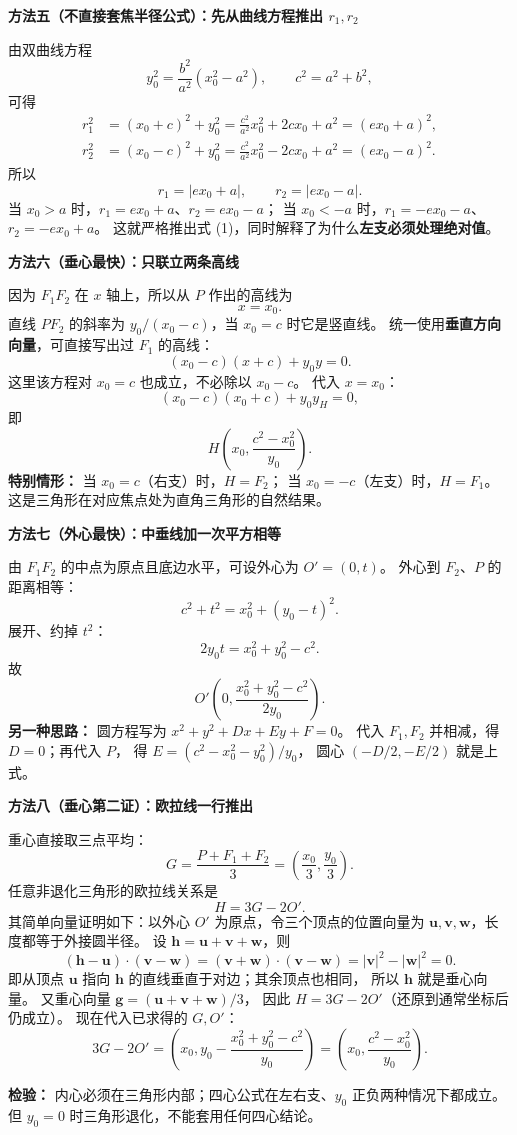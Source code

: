 \begin{proofbox}
\textbf{方法五（不直接套焦半径公式）：先从曲线方程推出 $r_1,r_2$}

由双曲线方程
\[
y_0^2=\frac{b^2}{a^2}(x_0^2-a^2),\qquad c^2=a^2+b^2,
\]
可得
\begin{align*}
r_1^2&=(x_0+c)^2+y_0^2
=\frac{c^2}{a^2}x_0^2+2cx_0+a^2
=(ex_0+a)^2,\\
r_2^2&=(x_0-c)^2+y_0^2
=\frac{c^2}{a^2}x_0^2-2cx_0+a^2
=(ex_0-a)^2.
\end{align*}
所以
\[
\boxed{r_1=|ex_0+a|},\qquad
\boxed{r_2=|ex_0-a|}.
\]
当 $x_0>a$ 时，$r_1=ex_0+a$、$r_2=ex_0-a$；
当 $x_0<-a$ 时，$r_1=-ex_0-a$、$r_2=-ex_0+a$。
这就严格推出式 (1)，同时解释了为什么\textbf{左支必须处理绝对值}。

\tcbline
\textbf{方法六（垂心最快）：只联立两条高线}

因为 $F_1F_2$ 在 $x$ 轴上，所以从 $P$ 作出的高线为
\[x=x_0.\]
直线 $PF_2$ 的斜率为 $y_0/(x_0-c)$，当 $x_0=c$ 时它是竖直线。
统一使用\textbf{垂直方向向量}，可直接写出过 $F_1$ 的高线：
\[
(x_0-c)(x+c)+y_0y=0.
\]
这里该方程对 $x_0=c$ 也成立，不必除以 $x_0-c$。
代入 $x=x_0$：
\[
(x_0-c)(x_0+c)+y_0y_H=0,
\]
即
\[
\boxed{H\left(x_0,\frac{c^2-x_0^2}{y_0}\right)}.
\]
\textbf{特别情形：} 当 $x_0=c$（右支）时，$H=F_2$；
当 $x_0=-c$（左支）时，$H=F_1$。
这是三角形在对应焦点处为直角三角形的自然结果。

\textbf{方法七（外心最快）：中垂线加一次平方相等}

由 $F_1F_2$ 的中点为原点且底边水平，可设外心为 $O'=(0,t)$。
外心到 $F_2$、$P$ 的距离相等：
\[
c^2+t^2=x_0^2+(y_0-t)^2.
\]
展开、约掉 $t^2$：
\[
2y_0t=x_0^2+y_0^2-c^2.
\]
故
\[
\boxed{O'\left(0,\frac{x_0^2+y_0^2-c^2}{2y_0}\right)}.
\]
\textbf{另一种思路：} 圆方程写为
$x^2+y^2+Dx+Ey+F=0$。
代入 $F_1,F_2$ 并相减，得 $D=0$；再代入 $P$，
得 $E=(c^2-x_0^2-y_0^2)/y_0$，
圆心 $( -D/2,-E/2)$ 就是上式。

\textbf{方法八（垂心第二证）：欧拉线一行推出}

重心直接取三点平均：
\[
\boxed{G=\frac{P+F_1+F_2}{3}=
\left(\frac{x_0}{3},\frac{y_0}{3}\right)}.
\]
任意非退化三角形的欧拉线关系是
\[
\boxed{H=3G-2O'}.
\]
其简单向量证明如下：以外心 $O'$ 为原点，令三个顶点的位置向量为
$\boldsymbol u,\boldsymbol v,\boldsymbol w$，长度都等于外接圆半径。
设 $\boldsymbol h=\boldsymbol u+\boldsymbol v+\boldsymbol w$，则
\[
(\boldsymbol h-\boldsymbol u)\cdot(\boldsymbol v-\boldsymbol w)
=(\boldsymbol v+\boldsymbol w)\cdot(\boldsymbol v-\boldsymbol w)
=|\boldsymbol v|^2-|\boldsymbol w|^2=0.
\]
即从顶点 $\boldsymbol u$ 指向 $\boldsymbol h$ 的直线垂直于对边；其余顶点也相同，
所以 $\boldsymbol h$ 就是垂心向量。
又重心向量 $\boldsymbol g=(\boldsymbol u+\boldsymbol v+\boldsymbol w)/3$，
因此 $H=3G-2O'$（还原到通常坐标后仍成立）。
现在代入已求得的 $G,O'$：
\[
3G-2O'=\left(x_0,y_0-\frac{x_0^2+y_0^2-c^2}{y_0}\right)
=\boxed{\left(x_0,\frac{c^2-x_0^2}{y_0}\right)}.
\]

\textbf{检验：} 内心必须在三角形内部；四心公式在左右支、$y_0$ 正负两种情况下都成立。
但 $y_0=0$ 时三角形退化，不能套用任何四心结论。
\end{proofbox}
